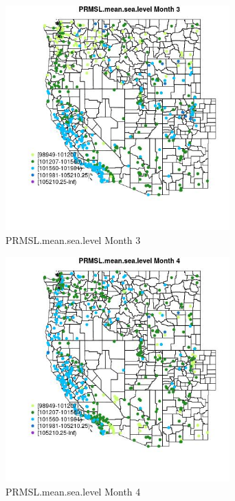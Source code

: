 \begin{figure} 
\centering  
\includegraphics[width=0.77\textwidth]{Code_Outputs/Report_ML_input_PM25_Step4_part_e_de_duplicated_aves_compiled_2019-05-14wNAs_MapObsMo3PRMSLmeansealevel.jpg} 
\caption{\label{fig:Report_ML_input_PM25_Step4_part_e_de_duplicated_aves_compiled_2019-05-14wNAsMapObsMo3PRMSLmeansealevel}PRMSL.mean.sea.level Month 3} 
\end{figure} 
 

\begin{figure} 
\centering  
\includegraphics[width=0.77\textwidth]{Code_Outputs/Report_ML_input_PM25_Step4_part_e_de_duplicated_aves_compiled_2019-05-14wNAs_MapObsMo4PRMSLmeansealevel.jpg} 
\caption{\label{fig:Report_ML_input_PM25_Step4_part_e_de_duplicated_aves_compiled_2019-05-14wNAsMapObsMo4PRMSLmeansealevel}PRMSL.mean.sea.level Month 4} 
\end{figure} 
 

